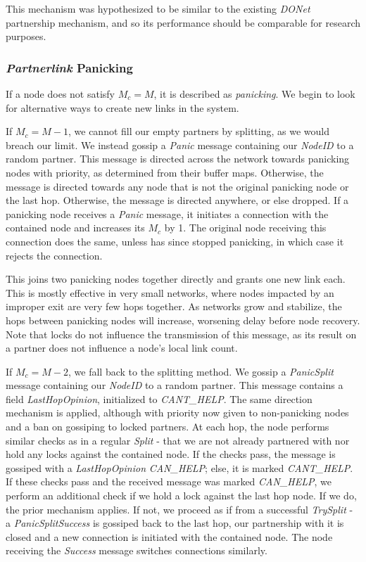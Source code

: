 \documentclass[12pt,a4paper]{article}
\begin{document}
This mechanism was hypothesized to be similar to the existing \textit{DONet} partnership mechanism, and so its performance should be comparable for research purposes.

\subsubsection{\textit{Partnerlink} Panicking}
If a node does not satisfy \(M_c = M\), it is described as \textit{panicking}. We begin to look for alternative ways to create new links in the system.

If \(M_c = M - 1\), we cannot fill our empty partners by splitting, as we would breach our limit. We instead gossip a 
\textit{Panic} message containing our \textit{NodeID} to a random partner. This message is directed across the network towards panicking nodes with priority, as determined from their buffer maps. Otherwise, the message is directed towards any node that is not the original panicking node or the last hop. Otherwise, the message is directed anywhere, or else dropped. If a panicking node receives a \textit{Panic} message, it initiates a connection with the contained node and increases its \(M_c\) by 1. The original node receiving this connection does the same, unless has since stopped panicking, in which case it rejects the connection.

This joins two panicking nodes together directly and grants one new link each. This is mostly effective in very small networks, where nodes impacted by an improper exit are very few hops together. As networks grow and stabilize, the hops between panicking nodes will increase, worsening delay before node recovery. Note that locks do not influence the transmission of this message, as its result on a partner does not influence a node's local link count.

If \(M_c = M - 2\), we fall back to the splitting method. We gossip a \textit{PanicSplit} message containing our \textit{NodeID} to a random partner. This message contains a field \textit{LastHopOpinion}, initialized to \textit{CANT\_HELP}. The same direction mechanism is applied, although with priority now given to non-panicking nodes and a ban on gossiping to locked partners. At each hop, the node performs similar checks as in a regular \textit{Split} - that we are not already partnered with nor hold any locks against the contained node. If the checks pass, the message is gossiped with a \textit{LastHopOpinion} \textit{CAN\_HELP}; else, it is marked \textit{CANT\_HELP}. If these checks pass and the received message was marked \textit{CAN\_HELP}, we perform an additional check if we hold a lock against the last hop node. If we do, the prior mechanism applies. If not, we proceed as if from a successful \textit{TrySplit} - a \textit{PanicSplitSuccess} is gossiped back to the last hop, our partnership with it is closed and a new connection is initiated with the contained node. The node receiving the \textit{Success} message switches connections similarly.
\end{document}
